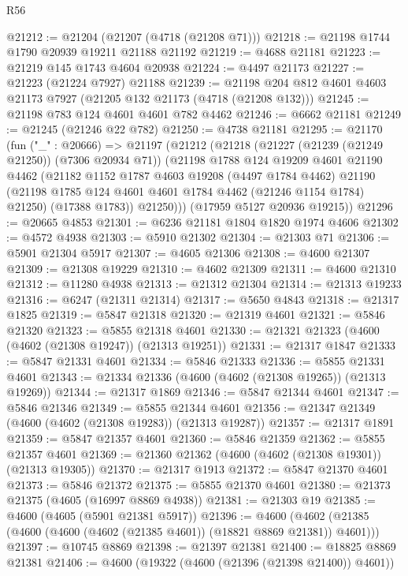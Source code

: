 \begin{lexlean}{R56}
\begin{coremodule}
@21212 := @21204 (@21207 (@4718 (@21208 @71)))
@21218 := @21198 @1744 @1790 @20939 @19211 @21188 @21192
@21219 := @4688 @21181
@21223 := @21219 @145 @1743 @4604 @20938
@21224 := @4497 @21173
@21227 := @21223 (@21224 @7927) @21188
@21239 := @21198 @204 @812 @4601 @4603 @21173 @7927 (@21205 @132 @21173 (@4718 (@21208 @132)))
@21245 := @21198 @783 @124 @4601 @4601 @782 @4462
@21246 := @6662 @21181
@21249 := @21245 (@21246 @22 @782)
@21250 := @4738 @21181
@21295 := @21170
    (fun ("_" : @20666) =>
    @21197
      (@21212
        (@21218
          (@21227 (@21239 (@21249 @21250)) (@7306 @20934 @71))
          (@21198
            @1788
            @124
            @19209
            @4601
            @21190
            @4462
            (@21182
              @1152
              @1787
              @4603
              @19208
              (@4497 @1784 @4462)
              @21190
              (@21198 @1785 @124 @4601 @4601 @1784 @4462 (@21246 @1154 @1784) @21250)
              (@17388 @1783))
            @21250)))
      (@17959 @5127 @20936 @19215))
@21296 := @20665 @4853
@21301 := @6236 @21181 @1804 @1820 @1974 @4606
@21302 := @4572 @4938
@21303 := @5910 @21302
@21304 := @21303 @71
@21306 := @5901 @21304 @5917
@21307 := @4605 @21306
@21308 := @4600 @21307
@21309 := @21308 @19229
@21310 := @4602 @21309
@21311 := @4600 @21310
@21312 := @11280 @4938
@21313 := @21312 @21304
@21314 := @21313 @19233
@21316 := @6247 (@21311 @21314)
@21317 := @5650 @4843
@21318 := @21317 @1825
@21319 := @5847 @21318
@21320 := @21319 @4601
@21321 := @5846 @21320
@21323 := @5855 @21318 @4601
@21330 := @21321 @21323 (@4600 (@4602 (@21308 @19247)) (@21313 @19251))
@21331 := @21317 @1847
@21333 := @5847 @21331 @4601
@21334 := @5846 @21333
@21336 := @5855 @21331 @4601
@21343 := @21334 @21336 (@4600 (@4602 (@21308 @19265)) (@21313 @19269))
@21344 := @21317 @1869
@21346 := @5847 @21344 @4601
@21347 := @5846 @21346
@21349 := @5855 @21344 @4601
@21356 := @21347 @21349 (@4600 (@4602 (@21308 @19283)) (@21313 @19287))
@21357 := @21317 @1891
@21359 := @5847 @21357 @4601
@21360 := @5846 @21359
@21362 := @5855 @21357 @4601
@21369 := @21360 @21362 (@4600 (@4602 (@21308 @19301)) (@21313 @19305))
@21370 := @21317 @1913
@21372 := @5847 @21370 @4601
@21373 := @5846 @21372
@21375 := @5855 @21370 @4601
@21380 := @21373 @21375 (@4605 (@16997 @8869 @4938))
@21381 := @21303 @19
@21385 := @4600 (@4605 (@5901 @21381 @5917))
@21396 := @4600 (@4602 (@21385 (@4600 (@4600 (@4602 (@21385 @4601)) (@18821 @8869 @21381)) @4601)))
@21397 := @10745 @8869
@21398 := @21397 @21381
@21400 := @18825 @8869 @21381
@21406 := @4600 (@19322 (@4600 (@21396 (@21398 @21400)) @4601))

\end{coremodule}
\end{lexlean}
